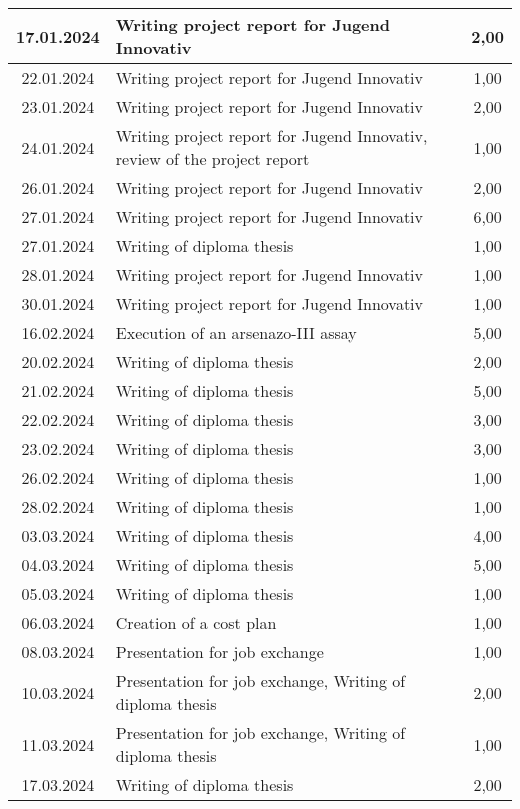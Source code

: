 \begin{longtable}{|c|p{9cm}|c|}
        17.01.2024 & Writing project report for Jugend Innovativ & 2,00 \\ \hline
        22.01.2024 & Writing project report for Jugend Innovativ & 1,00 \\ \hline
        23.01.2024 & Writing project report for Jugend Innovativ & 2,00 \\ \hline
        24.01.2024 & Writing project report for Jugend Innovativ, review of the project report & 1,00 \\ \hline
        26.01.2024 & Writing project report for Jugend Innovativ & 2,00 \\ \hline
        27.01.2024 & Writing project report for Jugend Innovativ & 6,00 \\ \hline
        27.01.2024 & Writing of diploma thesis & 1,00 \\ \hline
        28.01.2024 & Writing project report for Jugend Innovativ & 1,00 \\ \hline
        30.01.2024 & Writing project report for Jugend Innovativ & 1,00 \\ \hline
        16.02.2024 & Execution of an arsenazo-III assay & 5,00 \\ \hline
        20.02.2024 & Writing of diploma thesis & 2,00 \\ \hline
        21.02.2024 & Writing of diploma thesis & 5,00 \\ \hline
        22.02.2024 & Writing of diploma thesis & 3,00 \\ \hline
        23.02.2024 & Writing of diploma thesis & 3,00 \\ \hline
        26.02.2024 & Writing of diploma thesis & 1,00 \\ \hline
        28.02.2024 & Writing of diploma thesis & 1,00 \\ \hline
        03.03.2024 & Writing of diploma thesis & 4,00 \\ \hline
        04.03.2024 & Writing of diploma thesis & 5,00 \\ \hline
        05.03.2024 & Writing of diploma thesis & 1,00 \\ \hline
        06.03.2024 & Creation of a cost plan & 1,00 \\ \hline
        08.03.2024 & Presentation for job exchange & 1,00 \\ \hline
        10.03.2024 & Presentation for job exchange, Writing of diploma thesis & 2,00 \\ \hline
        11.03.2024 & Presentation for job exchange, Writing of diploma thesis & 1,00 \\ \hline
        17.03.2024 & Writing of diploma thesis & 2,00 \\ \hline

\end{longtable}

